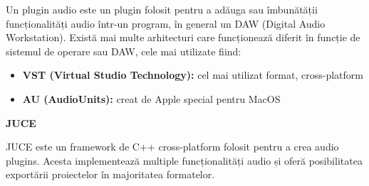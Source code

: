 \noindent Un plugin audio este un plugin folosit pentru a adăuga sau îmbunătății funcționalități audio într-un program, în general un DAW (Digital Audio Workstation). Există mai multe arhitecturi care funcționează diferit în funcție de sistemul de operare sau DAW, cele mai utilizate fiind: \par
\begin{itemize}
    \item \textbf{VST (Virtual Studio Technology):} cel mai utilizat format, cross-platform
    
    \item \textbf{AU (AudioUnits):} creat de Apple special pentru MacOS
\end{itemize}
\noindent \textbf{JUCE} \par
\noindent JUCE este un framework de C++ cross-platform folosit pentru a crea audio plugins. Acesta implementează multiple funcționalități audio și oferă posibilitatea exportării proiectelor în majoritatea formatelor.